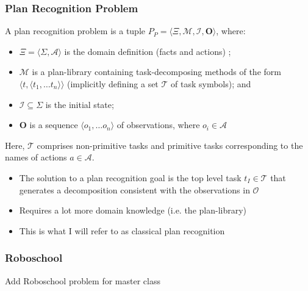 \documentclass{beamer}
\begin{document}
	\begin{frame}[c]\frametitle{Plan Recognition Problem}
		\begin{definition}
			A plan recognition problem is a tuple $P_{P} = \langle \Xi, \mathcal{M}, \mathcal{I}, \mathbf{O} \rangle$, where:
	       	\begin{itemize}
	       		\item $\Xi = \langle \Sigma, \mathcal{A} \rangle$ is the domain definition (facts and actions) ;
				\item $\mathcal{M}$ is a plan-library containing task-decomposing methods of the form $\langle t, \langle t_1, \dots t_n \rangle \rangle$ (implicitly defining a set $\mathcal{T}$ of task symbols); and
	       		\item $\mathcal{I} \subseteq \Sigma$ is the initial state;
	       		\item $\mathbf{O}$ is a sequence $\langle o_1, \dots o_n \rangle$ of observations, where $o_i \in \mathcal{A}$
	       	\end{itemize}
			Here, $\mathcal{T}$ comprises non-primitive tasks and primitive tasks corresponding to the names of actions $a \in \mathcal{A}$.
		\end{definition}
		
		\begin{itemize}
			\item The solution to a plan recognition goal is the top level task $t_{I} \in \mathcal{T}$ that generates a decomposition consistent with the observations in $\mathcal{O}$
			\item Requires a lot more domain knowledge (i.e. the plan-library)
			\item This is what I will refer to as classical plan recognition 
		\end{itemize}
	\end{frame}
	
	\begin{frame}[c]\frametitle{Roboschool}
		{\color{red} Add Roboschool problem for master class}
	\end{frame}
	
\end{document}
